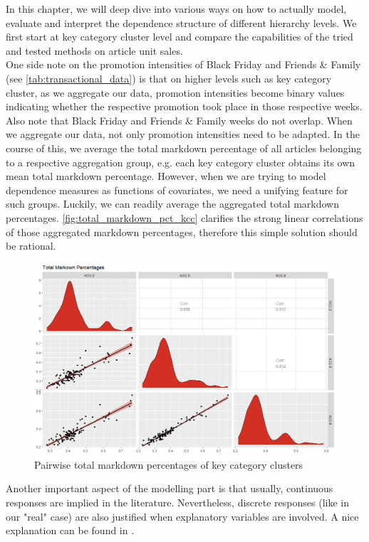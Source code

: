 
In this chapter, we will deep dive into various ways on how to actually model, evaluate and interpret the dependence structure of different hierarchy levels. We first start at key category cluster level and compare the capabilities of the tried and tested methods on article unit sales. \\

One side note on the promotion intensities of Black Friday and Friends \& Family (see \autoref{tab:transactional_data}) is that on higher levels such as key category cluster, as we aggregate our data, promotion intensities become binary values indicating whether the respective promotion took place in those respective weeks. Also note that Black Friday and Friends \& Family weeks do not overlap. When we aggregate our data, not only promotion intensities need to be adapted. In the course of this, we average the total markdown percentage of all articles belonging to a respective aggregation group, e.g. each key category cluster obtains its own mean total markdown percentage. However, when we are trying to model dependence measures as functions of covariates, we need a unifying feature for such groups. Luckily, we can readily average the aggregated total markdown percentages. \autoref{fig:total_markdown_pct_kcc} clarifies the strong linear correlations of those aggregated markdown percentages, therefore this simple solution should be rational. \\


\begin{figure}[H]
\centering
  \includegraphics[width=0.8\linewidth]{figures/total_markdown_pct_kcc.png}
  \caption{Pairwise total markdown percentages of key category clusters}
  \label{fig:total_markdown_pct_kcc}
\end{figure}

Another important aspect of the modelling part is that usually, continuous responses are implied in the literature. Nevertheless, discrete responses (like in our "real" case) are also justified when explanatory variables are involved. A nice explanation can be found in \cite{trivedi2017note}.


